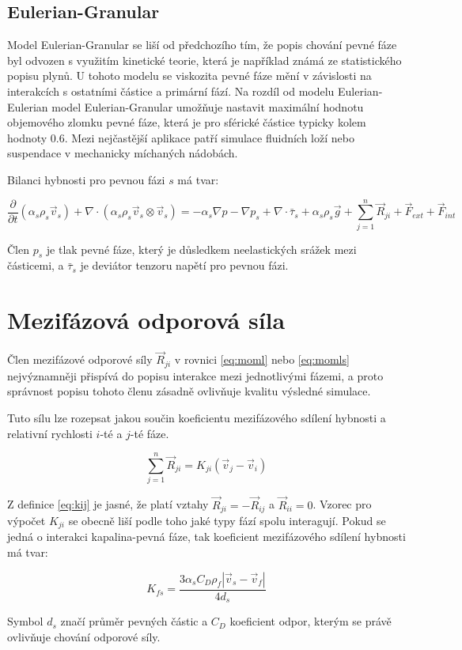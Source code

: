 \subsection{Eulerian-Granular}
Model Eulerian-Granular se liší od předchozího tím, že  popis chování pevné fáze byl odvozen s využitím kinetické teorie, která je například známá ze statistického popisu plynů. U tohoto modelu se viskozita pevné fáze mění v závislosti na interakcích s ostatními částice a primární fází. Na rozdíl od modelu Eulerian-Eulerian model Eulerian-Granular umožňuje nastavit maximální hodnotu objemového zlomku pevné fáze, která je pro sférické částice typicky kolem hodnoty \num{0.6}. Mezi nejčastější aplikace patří simulace fluidních loží nebo suspendace v mechanicky míchaných nádobách.

Bilanci hybnosti pro pevnou fázi $s$ má tvar:

\begin{equation}
	\frac{\partial}{\partial t} (\alpha_{s}\rho_{s}\vec{v}_{s}) + \nabla \cdot (\alpha_{s}\rho_{s} \vec{v}_{s} \otimes \vec{v}_{s}) = -\alpha_{s} \nabla p - \nabla p_{s} + \nabla \cdot \bar{\tau}_{s} + \alpha_{s}\rho_{s}\vec{g} + \sum_{j=1}^n \vec{R}_{ji} + \vec{F}_{ext} + \vec{F}_{int}
	\label{eq:momls}
\end{equation}
  
\noindent Člen $p_{s}$ je tlak pevné fáze, který je důsledkem neelastických srážek mezi částicemi, a $\bar{\tau}_{s}$ je deviátor tenzoru napětí pro pevnou fázi.       

\section{Mezifázová odporová síla}

Člen mezifázové odporové síly $\vec{R}_{ji}$ v rovnici \ref{eq:moml} nebo \ref{eq:momls} nejvýznamněji přispívá do popisu interakce mezi jednotlivými fázemi, a proto správnost popisu tohoto členu zásadně ovlivňuje kvalitu výsledné simulace. 

Tuto sílu lze rozepsat jakou součin koeficientu mezifázového sdílení hybnosti a relativní rychlosti $i$-té a $j$-té fáze.

\begin{equation}
	\sum_{j=1}^n \vec{R}_{ji} = K_{ji}(\vec{v}_{j} - \vec{v}_{i})
	\label{eq:kij}
\end{equation}

\noindent Z definice \ref{eq:kij} je jasné, že platí vztahy $\vec{R}_{ji} = -\vec{R}_{ij}$ a $\vec{R}_{ii} = 0$. Vzorec pro výpočet $K_{ji}$ se obecně liší podle toho jaké typy fází spolu interagují. Pokud se jedná o interakci kapalina-pevná fáze, tak koeficient mezifázového sdílení hybnosti má tvar:

\begin{equation}
	K_{fs}= \frac{3\alpha_{s}C_{D}\rho_{f}|\vec{v}_{s} - \vec{v}_{f}|}{4d_{s}}
	\label{eq:kfs}
\end{equation}
  
\noindent Symbol $d_{s}$ značí průměr pevných částic a $C_{D}$ koeficient odpor, kterým se právě ovlivňuje chování odporové síly. 
 

